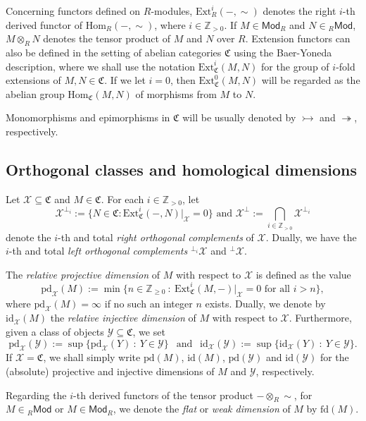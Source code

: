 \documentclass[10pt,reqno]{amsart}
\numberwithin{equation}{section}
\theoremstyle{remark}
\newcommand{\Ext}{\mathrm{Ext}}
\newcommand{\Hom}{\mathrm{Hom}}
\newcommand{\X}{\mathcal{X}}
\newcommand{\Y}{\mathcal{Y}}
\newcommand{\pd}{\mathrm{pd}}
\newcommand{\id}{\mathrm{id}}
\newcommand{\fd}{\mathrm{fd}}
\begin{document}
Concerning functors defined on $R$-modules, $\Ext ^i _R(-,\sim)$ denotes the right $i$-th derived functor of $\Hom_R(-,\sim)$, where $i \in \mathbb{Z}_{>0}$. If $M \in \mathsf{Mod}_R$ and $N \in {}_R\mathsf{Mod}$, $M \otimes_R N$ denotes the tensor product of $M$ and $N$ over $R$. Extension functors can also be defined in the setting of abelian categories $\mathfrak{C}$ using the Baer-Yoneda description, where we shall use the notation $\Ext^i_{\mathfrak{C}}(M,N)$ for the group of $i$-fold extensions of $M, N \in \mathfrak{C}$. If we let $i = 0$, then $\Ext^0_{\mathfrak{C}}(M,N)$ will be regarded as the abelian group $\Hom_{\mathfrak{C}}(M,N)$ of morphisms from $M$ to $N$. 

Monomorphisms and epimorphisms in $\mathfrak{C}$ will be usually denoted by $\rightarrowtail$ and $\twoheadrightarrow$, respectively. 



\subsection*{Orthogonal classes and homological dimensions}

Let $\mathcal{X} \subseteq \mathfrak{C}$ and $M \in \mathfrak{C}$. For each $i \in \mathbb{Z}_{> 0}$, let
\[
\X^{\perp_i} := \{ N \in \mathfrak{C}: \Ext^i_{\mathfrak{C}}(-,N) |_{\X} = 0 \} \mbox{ and } \X^{\perp} := \bigcap_{i \in \mathbb{Z}_{> 0}} \X^{\perp_i}
\]
denote the $i$-th and total \emph{right orthogonal complements} of $\mathcal{X}$. Dually, we have the $i$-th and total \emph{left orthogonal complements} ${}^{\perp_i}\X$ and ${}^{\perp}\X$. 
  
The \emph{relative projective dimension} of $M$ with respect to $\X$ is defined as the value
\[
\pd_{\X}(M) := \min \{n \in \mathbb{Z}_{\geq 0} \ : \ \Ext^i_{\mathfrak{C}}(M,-)|_{\X} = 0 \mbox{ for all } i > n\},
\]
where $\pd_{\X}(M) = \infty$ if no such an integer $n$ exists. Dually, we denote by $\id_{\X}(M)$ the \emph{relative injective dimension} of $M$ with respect to $\X$. Furthermore, given a class of objects $\Y \subseteq \mathfrak{C}$, we set  
\[
\pd_{\X}(\Y) := \sup\{ \pd_{\X}(Y) \ : \ Y \in \Y \} \ \ \mbox{ and } \ \ \id_{\X}(\Y) := \sup \{ \id_{\X}(Y) \ : \ Y \in \Y \}. 
\]
If $\X = \mathfrak{C}$, we shall simply write $\pd(M)$, $\id(M)$, $\pd(\Y)$ and $\id(\Y)$ for the (absolute) projective and injective dimensions of $M$ and $\Y$, respectively. 

Regarding the $i$-th derived functors of the tensor product $- \otimes_R \sim$, for $M \in {}_R\mathsf{Mod}$ or $M \in \mathsf{Mod}_R$, we denote the \emph{flat} or \emph{weak dimension} of $M$ by $\fd(M)$. 
\end{document}
